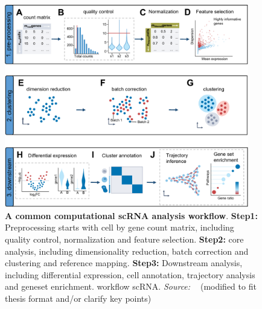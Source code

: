 \begin{figure}[!ht]
	\centering
	\includegraphics[width=0.95\textwidth]{workflow_scRNA/fig}
	\vspace{0.1cm}
	\caption[A common computational scRNA analysis workflow]{
		\textbf{A common computational scRNA analysis workflow}. 
		\textbf{Step1:} Preprocessing starts with cell by gene count matrix, including quality control, normalization and feature selection. 
		\textbf{Step2:} core analysis, including dimensionality reduction, batch correction and clustering and reference mapping.
		\textbf{Step3:} Downstream analysis, including differential expression, cell annotation, trajectory analysis and geneset enrichment.
	workflow scRNA. \emph{Source: ~\cite{heumos2023best}} (modified to fit thesis format and/or clarify key points)}
	\label{fig:workflow_scRNA}
\end{figure}

